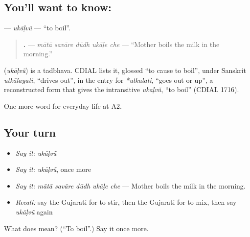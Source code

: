 \subsection*{You'll want to know: }
\textbf{} — \emph{ukāḷvũ} — \textquotedblleft{}to boil\textquotedblright{}.

\begin{quote}
\textbf{    .} — \emph{mātā savāre dūdh ukāḷe che} — \textquotedblleft{}Mother boils the milk in the morning.\textquotedblright{}
\end{quote}

\begin{cousinweb}
\textbf{} (\emph{ukāḷvũ}) is a tadbhava. CDIAL lists it, glossed \textquotedblleft{}to cause to boil\textquotedblright{}, under Sanskrit \emph{utkālayati}, \textquotedblleft{}drives out\textquotedblright{}, in the entry for \emph{*utkalati}, \textquotedblleft{}goes out or up\textquotedblright{}, a reconstructed form that gives the intransitive \emph{ukaḷvũ}, \textquotedblleft{}to boil\textquotedblright{} (CDIAL 1716).
\end{cousinweb}

\begin{grammarlens}[title={What you've built}]
One more word for everyday life at A2.
\end{grammarlens}

\subsection*{Your turn}
\begin{itemize}
\raggedright
  \item \emph{Say it:} \emph{ukāḷvũ}
  \item \emph{Say it:} \emph{ukāḷvũ}, once more
  \item \emph{Say it:} \emph{mātā savāre dūdh ukāḷe che} — Mother boils the milk in the morning.
  \item \emph{Recall:} say the Gujarati for to stir, then the Gujarati for to mix, then say \emph{ukāḷvũ} again
\end{itemize}

\begin{tcolorbox}[breakable,colback=teal!4,colframe=teal!35!black,title={Before you move on}]
What does  mean? (\textquotedblleft{}To boil\textquotedblright{}.) Say it once more.
\end{tcolorbox}
